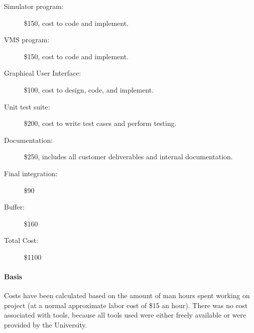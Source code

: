 \documentclass{article}
\begin{document}
\begin{description}
  \item[Simulator program:] \$150, cost to code and implement.
  \item[VMS program:] \$150, cost to code and implement.
  \item[Graphical User Interface:] \$100, cost to design, code, and implement.
  \item[Unit test suite:] \$200, cost to write test cases and perform testing.
  \item[Documentation:] \$250, includes all customer deliverables and internal documentation.
  \item[Final integration:] \$90
  \item[Buffer:] \$160
  \item[Total Cost:] \$1100
\end{description}

\paragraph{Basis} Costs have been calculated based on the amount of man hours spent working on project (at a normal approximate labor cost of \$15 an hour). There was no cost associated with tools, because all tools used were either freely available or were provided by the University.
\end{document}

